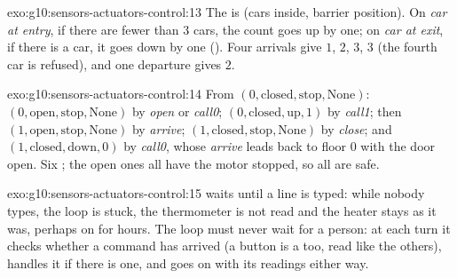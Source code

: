\begin{solution}{exo:g10:sensors-actuators-control:13}
The  is (cars inside, barrier position). On \textit{car at entry}, if there are fewer than $3$ cars, the count
goes up by one; on \textit{car at exit}, if there is a car, it goes down by one ().
Four arrivals give $1$, $2$, $3$, $3$ (the fourth car is refused), and one departure gives $2$.
\end{solution}

\begin{solution}{exo:g10:sensors-actuators-control:14}
From $(0, \text{closed}, \text{stop}, \text{None})$: $(0, \text{open}, \text{stop}, \text{None})$ by \textit{open}
or \textit{call0}; $(0, \text{closed}, \text{up}, 1)$ by \textit{call1}; then $(1, \text{open}, \text{stop},
\text{None})$ by \textit{arrive}; $(1, \text{closed}, \text{stop}, \text{None})$ by \textit{close}; and
$(1, \text{closed}, \text{down}, 0)$ by \textit{call0}, whose \textit{arrive} leads back to floor $0$ with the door
open. Six ; the open ones all have the motor stopped, so all are safe.
\end{solution}

\begin{solution}{exo:g10:sensors-actuators-control:15}
 waits until a line is typed: while nobody types, the loop is stuck, the thermometer is not read and the
heater stays as it was, perhaps on for hours. The loop must never wait for a person: at each turn it checks whether
a command has arrived (a button is a  too, read like the others), handles it if there is one, and goes on with
its readings either way.
\end{solution}


